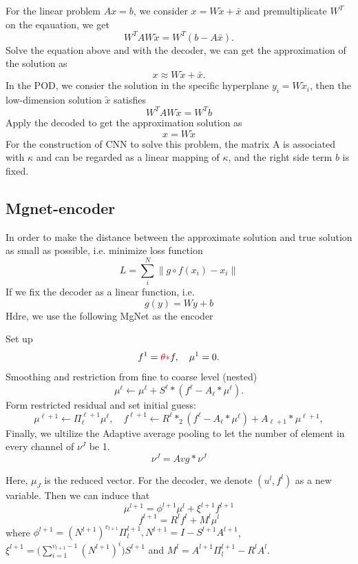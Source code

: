 For the linear problem $Ax=b$, we consider $x = W\tilde{x}+\bar{x}$ and premultiplicate $W^T$ on the eqauation, we get
$$
W^TAW\tilde{x} = W^T(b-A\bar{x}).
$$
Solve the equation above and with the decoder, we can get the approximation of the solution as
$$
x \approx W\tilde{x} + \bar{x}.
$$
In the POD, we consier the solution in the specific hyperplane $y_i = W\tilde{x}_i$, then the low-dimension solution $\tilde{x}$ satisfies
$$
W^TAW\tilde{x} = W^Tb
$$
Apply the decoded to get the approximation solution as
$$
x = W\tilde{x}
$$
For the construction of CNN to solve this problem, the matrix A is associated with $\kappa$ and can be regarded as a linear mapping of $\kappa$, and the right side term $b$ is fixed.

\subsection{Mgnet-encoder}
In order to make the distance between the approximate solution and true solution  as small as possible, i.e. minimize loss function
$$
L = \sum_{i}^{N} \| g  \circ f(x_i) - x_i \|
$$
If we fix the decoder as a linear function, i.e.
$$
g(y) = Wy + b
$$
Hdre, we use the following MgNet as the encoder
\begin{breakablealgorithm}%
	\caption{$\mu^J = {\text{MgNet}}(f; J,\nu_1, \cdots, \nu_J)$}
	\label{alg:L-Slash11d}
	\begin{algorithmic}
		\State Set up
		$$
		f^1 = {\color{red} \theta\ast} f, \quad \mu^{1}=0. 
		$$
		\State Smoothing and restriction from fine to coarse level (nested)
		\State
		\begin{equation}\label{eq:smoothing}
		\mu^{\ell} \leftarrow \mu^{\ell} + S^\ell \ast (f^\ell - A_\ell \ast \mu^{\ell}).
		\end{equation}
		\EndFor
		\State Form restricted residual and set initial guess:
		$$
		\mu^{\ell+1} \leftarrow \Pi_{\ell}^{\ell+1}\mu^\ell , \quad
		f^{\ell+1} \leftarrow R^\ell \ast_2 (f^\ell -  A_\ell \ast
		\mu^{\ell}) + A_{\ell+1}\ast 	\mu^{\ell+1} ,    %
		$$
		\EndFor
		\State
		Finally, we ultilize the Adaptive average pooling to let the number of element in every channel of $\nu^J$ be 1.
		$$\nu^J = Avg \ast \nu^J$$
	\end{algorithmic}
\end{breakablealgorithm}
Here, $\mu_J$ is the reduced vector. For the decoder, we denote $(u^l,f^l)$ as a new variable.
Then we can induce that
$$\mu^{l+1}=\phi^{l+1}\mu^l + \xi^{l+1}f^{l+1}$$
$$f^{l+1} = R^l f^l + M^l \mu^l $$
where $\phi^{l+1}= (N^{l+1})^{v_{l+1}}\Pi_l^{l+1}, N^{l+1}= I - S^{l+1}A^{l+1} $, $\xi^{l+1}=\big(\sum_{i=1}^{v_{l+1}-1}(N^{l+1})^i\big)S^{l+1}$ and $M^l = A^{l+1}\Pi_l^{l+1} - R^lA^l$.

